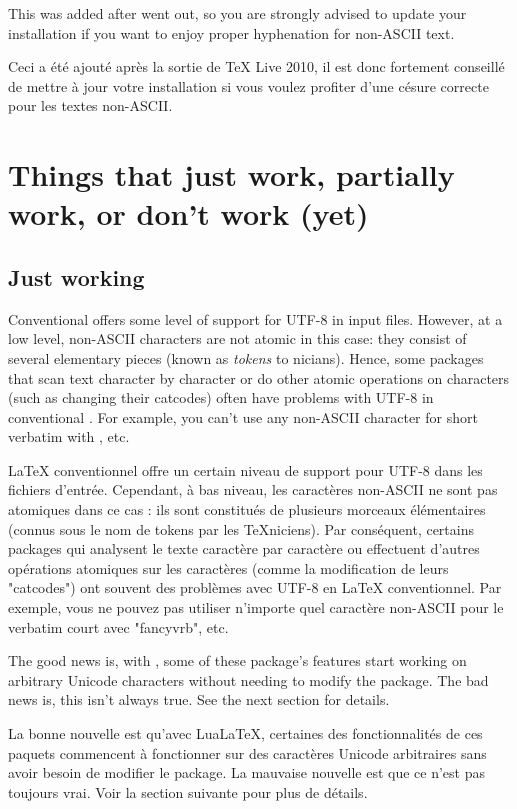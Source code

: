 \documentclass{lltxdoc}
\begin{document}
This was added after  went out, so you are strongly advised to
update your installation if you want to enjoy proper hyphenation for non-ASCII
text.

Ceci a été ajouté après la sortie de TeX Live 2010, il est donc fortement conseillé de mettre à jour votre installation si vous voulez profiter d'une césure correcte pour les textes non-ASCII.


\section{Things that just work, partially work, or don't work (yet)}
\label{workornot}

\subsection{Just working}\label{working}

Conventional \latex offers some level of support for UTF-8 in input files.
However, at a low level, non-ASCII characters are not atomic in this case:
they consist of several elementary pieces (known as \emph{tokens} to
\tex{}nicians). Hence, some packages that scan text character by character or
do other atomic operations on characters (such as changing their catcodes)
often have problems with UTF-8 in conventional \latex. For example, you can't
use any non-ASCII character for short verbatim with , etc.

LaTeX conventionnel offre un certain niveau de support pour UTF-8 dans les fichiers d'entrée. Cependant, à bas niveau, les caractères non-ASCII ne sont pas atomiques dans ce cas : ils sont constitués de plusieurs morceaux élémentaires (connus sous le nom de tokens par les TeXniciens). Par conséquent, certains packages qui analysent le texte caractère par caractère ou effectuent d'autres opérations atomiques sur les caractères (comme la modification de leurs "catcodes") ont souvent des problèmes avec UTF-8 en LaTeX conventionnel. Par exemple, vous ne pouvez pas utiliser n'importe quel caractère non-ASCII pour le verbatim court avec "fancyvrb", etc.

The good news is, with \lualatex, some of these package's features start
working on arbitrary Unicode characters without needing to modify the package.
The bad news is, this isn't always true. See the next section for details.

La bonne nouvelle est qu'avec LuaLaTeX, certaines des fonctionnalités de ces paquets commencent à fonctionner sur des caractères Unicode arbitraires sans avoir besoin de modifier le package. La mauvaise nouvelle est que ce n'est pas toujours vrai. Voir la section suivante pour plus de détails.
\end{document}
